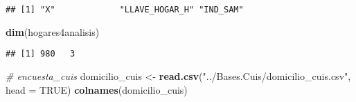 \documentclass[11pt,]{article}
\newenvironment{Shaded}{\begin{snugshade}}{\end{snugshade}}
\newcommand{\KeywordTok}[1]{\textcolor[rgb]{0.13,0.29,0.53}{\textbf{#1}}}
\newcommand{\DataTypeTok}[1]{\textcolor[rgb]{0.13,0.29,0.53}{#1}}
\newcommand{\StringTok}[1]{\textcolor[rgb]{0.31,0.60,0.02}{#1}}
\newcommand{\CommentTok}[1]{\textcolor[rgb]{0.56,0.35,0.01}{\textit{#1}}}
\newcommand{\OtherTok}[1]{\textcolor[rgb]{0.56,0.35,0.01}{#1}}
\newcommand{\NormalTok}[1]{#1}
\begin{document}
\begin{verbatim}
## [1] "X"             "LLAVE_HOGAR_H" "IND_SAM"
\end{verbatim}

\begin{Shaded}
\begin{Highlighting}[]
\KeywordTok{dim}\NormalTok{(hogares4analisis)}
\end{Highlighting}
\end{Shaded}

\begin{verbatim}
## [1] 980   3
\end{verbatim}

\begin{Shaded}
\begin{Highlighting}[]
\CommentTok{# encuesta_cuis}
\NormalTok{domicilio_cuis <-}\StringTok{ }\KeywordTok{read.csv}\NormalTok{(}\StringTok{"../Bases.Cuis/domicilio_cuis.csv"}\NormalTok{, }\DataTypeTok{head =} \OtherTok{TRUE}\NormalTok{)}
\KeywordTok{colnames}\NormalTok{(domicilio_cuis)}
\end{Highlighting}
\end{Shaded}
\end{document}
